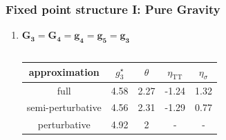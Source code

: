 \documentclass[]{beamer}  %
\newcommand\TTspace{ 0pt }
\newcommand\TT{ \scriptscriptstyle{\mathrm{T\hspace{\TTspace}T}} }
\begin{document}


\begin{frame}
  \frametitle{Fixed point structure I: Pure Gravity}

  \begin{center}
  \end{center}

  \begin{enumerate}
    \item
      $\mathbf{G_3 = G_4 = g_4 = g_5 = g_3}$

      \vspace{-7pt}
      \begin{columns}[T]
        \begin{column}{.8\textwidth}
          \renewcommand{\arraystretch}{1.5}
          \begin{center}
            \begin{tabular}{c|cccc}
              approximation&$g_{3}^{\star}$& $\theta$& $\eta_{\TT}$& $\eta_{\sigma}$\\
              \hline
              full              & 4.58 & 2.27 & -1.24 & 1.32\\
              semi-perturbative & 4.56 & 2.31 & -1.29 & 0.77\\
              perturbative      & 4.92 & 2    &     - &    -
            \end{tabular}
          \end{center}
        \end{column}


\end{columns}
\end{enumerate}
\end{frame}
\end{document}
